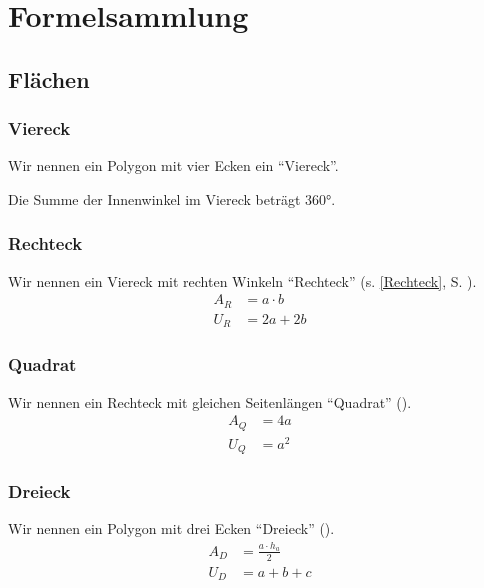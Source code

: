 \documentclass[a4paper]{book}%
\theoremstyle{definition}
\begin{document}
\printglossary
\printglossary[type=symbols,style=long]

\chapter{Formelsammlung}

\section{Flächen}

\subsection{Viereck}\label{fs:Viereck}

Wir nennen ein Polygon mit vier Ecken ein \enquote{Viereck}.

Die Summe der Innenwinkel im Viereck beträgt 360°.


\subsection{Rechteck}\label{fs:Rechteck}

Wir nennen ein Viereck mit rechten Winkeln \enquote{Rechteck} (s. \ref{Rechteck}, S. \pageref{Rechteck}).
\begin{align}\label{eqn:fsRechteck}
    A_R &= a \cdot b\\
    U_R &= 2a + 2b
\end{align}


\subsection{Quadrat}\label{fs:Quadrat}

Wir nennen ein Rechteck mit gleichen Seitenlängen \enquote{Quadrat} ().
\begin{align}\label{eqn:fsQuadrat}
  A_Q &= 4a \\
  U_Q &= a^2
\end{align}


\subsection{Dreieck}\label{fs:Dreieck}

Wir nennen ein Polygon mit drei Ecken \enquote{Dreieck} ().
\begin{align}\label{eqn:fsDreieck}
  A_D &= \frac{a \cdot h_a}{2} \\
  U_D &= a+b+c
\end{align}
\end{document}
